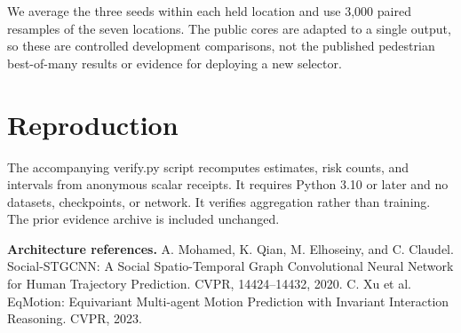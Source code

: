 \documentclass[10pt]{article}
\begin{document}
We average the three seeds within each held location and use 3,000
paired resamples of the seven locations. The public cores are adapted
to a single output, so these are controlled development comparisons,
not the published pedestrian best-of-many results or evidence for
deploying a new selector.

\section*{Reproduction}

The accompanying verify.py script recomputes estimates, risk counts,
and intervals from anonymous scalar receipts. It requires Python
3.10 or later and no datasets, checkpoints, or network. It verifies
aggregation rather than training. The prior evidence archive is included
unchanged.

\textbf{Architecture references.}
A. Mohamed, K. Qian, M. Elhoseiny, and C. Claudel.
Social-STGCNN: A Social Spatio-Temporal Graph Convolutional Neural
Network for Human Trajectory Prediction. CVPR, 14424--14432, 2020.
C. Xu et al. EqMotion: Equivariant Multi-agent Motion Prediction with
Invariant Interaction Reasoning. CVPR, 2023.
\end{document}

